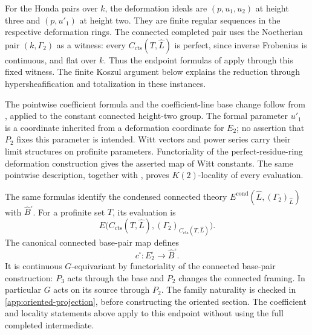 \documentclass[11pt]{article}
\numberwithin{equation}{section}
\theoremstyle{definition}
\theoremstyle{remark}
\newcommand{\cts}{\mathrm{cts}}
\begin{document}
For the Honda pairs over \(k\), the deformation ideals are
\((p,u_1,u_2)\) at height three and \((p,u'_1)\) at height two.
They are finite regular sequences in the respective deformation rings.
The connected completed pair uses the Noetherian pair
\((k,\Gamma_2)\) as a witness: every
\(C_{\cts}(T,\widehat L)\) is perfect, since inverse Frobenius is
continuous, and flat over \(k\). Thus the endpoint formulas of
\cite[Proposition~4.5.5]{BMR2026} apply through this fixed witness.
The finite Koszul argument below explains the reduction through
hypersheafification and totalization in these instances.

The pointwise coefficient formula and the coefficient-line base change
follow from \cite[Lemma 4.2.12 and Proposition 4.5.5]{BMR2026}, applied to
the constant connected height-two group.  The formal parameter $u'_1$
is a coordinate inherited from a deformation coordinate for $E_2$; no
assertion that $P_2$ fixes this parameter is intended.  Witt vectors and
power series carry their limit structures on profinite parameters.
Functoriality of the perfect-residue-ring deformation construction gives
the asserted map of Witt constants.  The same pointwise description,
together with \cite[Proposition 4.4.2]{BMR2026}, proves $K(2)$-locality
of every evaluation.

The same formulas identify the condensed connected theory
\(E^{\mathrm{cond}}(\widehat L,(\Gamma_2)_{\widehat L})\)
with \(\widehat B^\square\). For a profinite set \(T\), its evaluation is
\[
 E\bigl(C_{\cts}(T,\widehat L),
        (\Gamma_2)_{C_{\cts}(T,\widehat L)}\bigr).
\]
The canonical connected
base-pair map defines
\[
 c^\square:E_2^\square\longrightarrow\widehat B^\square.
\]
It is continuous \(G\)-equivariant by functoriality of the connected
base-pair construction: \(P_3\) acts through the base and \(P_2\)
changes the connected framing. In particular \(G\) acts on its
source through \(P_2\). The family naturality is checked in
\cref{app:oriented-projection}, before constructing the oriented section.
The coefficient and locality statements above apply to this endpoint
without using the full completed intermediate.
\end{document}
